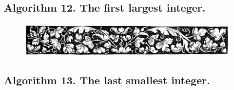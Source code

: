 \documentclass[preview]{standalone}
\begin{document}
\subsection[The first largest integer from a finite list.]{
    \color{section} Algorithm 12. \color{black} The first largest integer.
}
\vspace{-.2\baselineskip}

\vspace{1\baselineskip}
\begin{center}
    
\end{center}
\vspace{1\baselineskip}
\begin{center}
    
\end{center}


\begin{figure}[!h]
    \centering
    \includegraphics[width=14cm]{../resources/jpg/3.1.algorithms/border2.jpg}
\end{figure}
\subsection[The last smallest integer from a finite list.]{
    \color{section} Algorithm 13. \color{black} The last smallest integer.
}
\vspace{-0.2\baselineskip}

\vspace{1\baselineskip}
\begin{center}
    
\end{center}
\vspace{1\baselineskip}
\begin{center}
    
\end{center}
\end{document}
